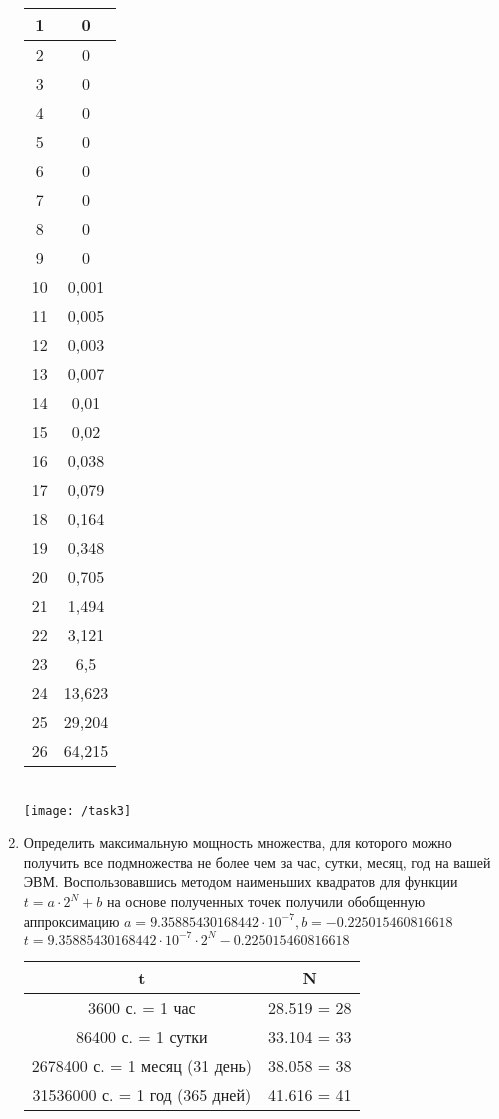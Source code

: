 \documentclass[a4paper,14pt]{extarticle}
\begin{document}
\begin{enumerate}[№1. ]
\begin{center}
\begin{tabular}{ cc}
	\hline
	1&0\\
	\hline
	2&0\\
	\hline
	3&0\\
	\hline
	4&0\\
	\hline
	5&0\\
	\hline
	6&0\\
	\hline
	7&0\\
	\hline
	8&0\\
	\hline
	9&0\\
	\hline
	10&0,001\\
	\hline
	11&0,005\\
	\hline
	12&0,003\\
	\hline
	13&0,007 \\
	\hline
	14&0,01\\
	\hline
	15&0,02\\
	\hline
	16&0,038\\
	\hline
	17&0,079\\
	\hline
	18&0,164\\
	\hline
	19&0,348\\
	\hline
	20&0,705\\
	\hline
	21&1,494\\
	\hline
	22&3,121\\
	\hline
	23&6,5\\
	\hline
	24&13,623\\
	\hline
	25&29,204\\
	\hline
	26&64,215\\
	\hline
\end{tabular}\\
\texttt{[image: /task3]}\\
\end{center}
\item Определить максимальную мощность множества, для которого можно получить все подмножества не более чем за час, сутки, месяц, год на вашей ЭВМ.\bigbreak
Воспользовавшись методом наименьших квадратов для функции $t = a \cdot 2^N + b$ на основе полученных точек получили обобщенную аппроксимацию $a = 9.35885430168442\cdot10^{-7}, b = -0.225015460816618$\\
$t = 9.35885430168442\cdot10^{-7} \cdot 2^N - 0.225015460816618$\bigbreak
\begin{tabular}{ c|c} 
	
	\hline
	t&N\\
	\hline
	3600 с. = 1 час&28.519 = 28\\
	\hline
	86400 с. = 1 сутки&33.104 = 33\\
	\hline
	2678400 с. = 1 месяц (31 день)&38.058 = 38\\
	\hline
	31536000 с. = 1 год (365 дней)&41.616 = 41\\
	\hline
\end{tabular}


\end{enumerate}
\end{document}
